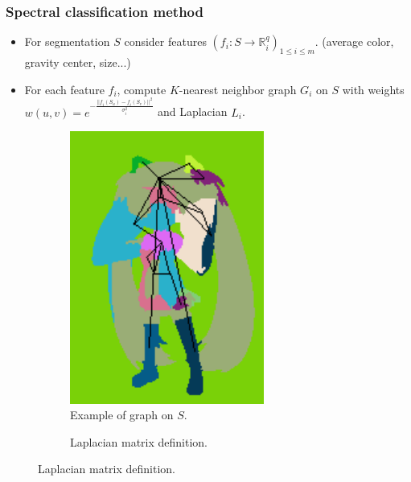 \documentclass{beamer}
\begin{document}
\begin{frame}
\frametitle{Spectral classification method}
\begin{itemize}
\item For segmentation $S$ consider features $(f_i : S \rightarrow \mathbb{R}^q_i)_{1 \leq i \leq m}$. (average color, gravity center, size...)
\item For each feature $f_i$, compute $K$-nearest neighbor graph $G_i$ on $S$ with weights $w(u,v) = e^{-\frac{||f_i(S_u) - f_i(S_v)||^2}{\sigma_i^2}}$ and Laplacian $L_i$.
\end{itemize}

\begin{figure}[htb!]
\centering
\begin{subfigure}{0.3\textwidth}
\centering
\includegraphics[width=0.7\textwidth]{../images/miku_seg_graph.png}
\caption{Example of graph on $S$.}
\end{subfigure}
\begin{subfigure}{0.65\textwidth}
\caption{Laplacian matrix definition.}
\end{subfigure}
\end{figure}
\end{frame}
\end{document}
